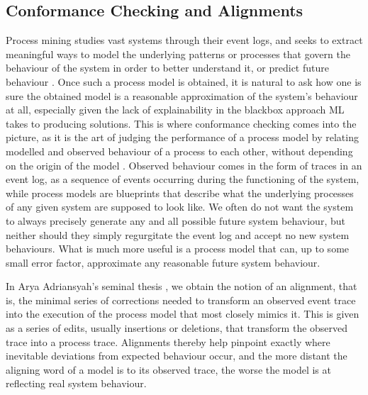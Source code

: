\documentclass[runningheads]{llncs}
\begin{document}
	\subsection{Conformance Checking and Alignments} 
	
	Process mining studies vast systems through their event logs, and seeks to extract meaningful ways to model the underlying patterns or processes that govern the behaviour of the system in order to better understand it, or predict future behaviour \cite{A16}.
	Once such a process model is obtained, it is natural to ask how one is sure the obtained model is a reasonable approximation of the system’s behaviour at all, especially given the lack of explainability in the blackbox approach ML takes to producing solutions.
	This is where conformance checking comes into the picture, as it is the art of judging the performance of a process model by relating modelled and observed behaviour of a process to each other, without depending on the origin of the model \cite{CDSW18}.
	Observed behaviour comes in the form of traces in an event log, as a sequence of events occurring during the functioning of the system, while process models are blueprints that describe what the underlying processes of any given system are supposed to look like.
	We often do not want the system to always precisely generate any and all possible future system behaviour, but neither should they simply regurgitate the event log and accept no new system behaviours. 
	What is much more useful is a process model that can, up to some small error factor, approximate any reasonable future system behaviour. 
	
	In Arya Adriansyah's seminal thesis \cite{Adriansyah2014AligningOA}, we obtain the notion of an alignment, that is, the minimal series of corrections needed to transform an observed event trace into the execution of the process model that most closely mimics it.  
	This is given as a series of edits, usually insertions or deletions, that transform the observed trace into a process trace.  
	Alignments thereby help pinpoint exactly where inevitable deviations from expected behaviour occur, and the more distant the aligning word of a model is to its observed trace, the worse the model is at reflecting real system behaviour. 
	
\end{document}
